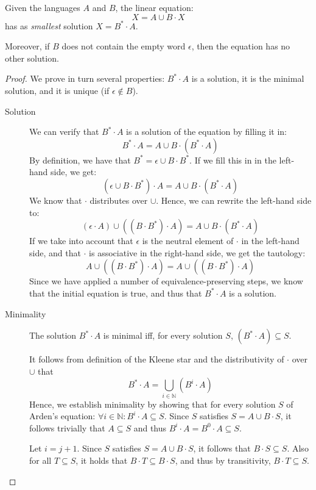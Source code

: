 \begin{theorem}\label{arden}
Given the languages $A$ and $B$, the linear equation:
\begin{equation*}
X = A \cup B \cdot X
\end{equation*}
has as \emph{smallest} solution $X = B^* \cdot A$. 

Moreover, if $B$ does not contain the empty word $\epsilon$, then the equation
has no other solution.
\end{theorem}
\begin{proof}

We prove in turn several properties: $B^*\cdot A$ is a solution, it is the minimal
solution, and it is unique (if $\epsilon \not\in B$).
\begin{description}
\item[Solution]
We can verify that $B^* \cdot A$ is a solution of the equation by filling it in:
\begin{equation*}
B^* \cdot A = A \cup B \cdot (B^* \cdot A)
\end{equation*}
By definition, we have that $B^* = \epsilon \cup B \cdot B^*$. If we fill this
in in the left-hand side, we get:
\begin{equation*}
(\epsilon \cup B \cdot B^*) \cdot A = A \cup B \cdot (B^* \cdot A)
\end{equation*}
We know that $\cdot$ distributes over $\cup$. Hence, we can rewrite the left-hand
side to:
\begin{equation*}
(\epsilon \cdot A) \cup ((B \cdot B^*) \cdot A) = A \cup B \cdot (B^* \cdot A)
\end{equation*}
If we take into account that $\epsilon$ is the neutral element of $\cdot$ in the left-hand
side, and that $\cdot$ is associative in the right-hand side, we get the tautology:
\begin{equation*}
A \cup ((B \cdot B^*) \cdot A) = A \cup ((B \cdot B^*) \cdot A)
\end{equation*}
Since we have applied a number of equivalence-preserving steps, we know that the initial
equation is true, and thus that $B^* \cdot A$ is a solution.

\item[Minimality]
  The solution $B^* \cdot A$ is minimal iff, for every solution $S$, $(B^* \cdot A) \subseteq S$.

  It follows from definition of the Kleene star and the distributivity of $\cdot$ over $\cup$ that
  \begin{equation*}
   B^* \cdot A = \bigcup_{i \in \mathbb{N}} (B^i \cdot A)
 \end{equation*}
  Hence, we establish minimality by showing that for every solution $S$ of Arden's equation: $\forall i \in \mathbb{N} : B^i \cdot A \subseteq S$.
{
    Since $S$ satisfies $S = A \cup B \cdot S$, it follows trivially that $A \subseteq S$ and thus
    $B^i \cdot A = B^0 \cdot A \subseteq S$.
}
{
    Let $i = j+1$. Since $S$ satisfies $S = A \cup B \cdot S$, it follows that $B \cdot S \subseteq S$.
    Also for all $T \subseteq S$, it holds that $B \cdot T \subseteq B \cdot S$, and thus
    by transitivity, $B \cdot T \subseteq S$.

}
\end{description}
\end{proof}
